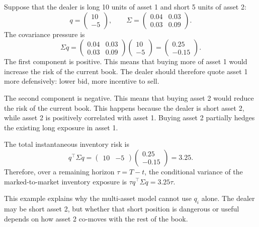 \documentclass[a4paper,10pt,titlepage,oneside,openany]{book}
\theoremstyle{plain}\newtheorem{theorem}{Theorem}[chapter]
\theoremstyle{definition}\newtheorem{definition}{Definition}[chapter]
\theoremstyle{remark}\newtheorem{remark}{Remark}[chapter]
\begin{document}
Suppose that the dealer is long 10 units of asset 1 and short 5 units of asset 2:
\[
q=
\begin{pmatrix}
10\\
-5
\end{pmatrix},
\qquad
\Sigma=
\begin{pmatrix}
0.04 & 0.03\\
0.03 & 0.09
\end{pmatrix}.
\]
The covariance pressure is
\[
\Sigma q
=
\begin{pmatrix}
0.04 & 0.03\\
0.03 & 0.09
\end{pmatrix}
\begin{pmatrix}
10\\
-5
\end{pmatrix}
=
\begin{pmatrix}
0.25\\
-0.15
\end{pmatrix}.
\]
The first component is positive. This means that buying more of asset 1 would increase the risk of the current book. The dealer should therefore quote asset 1 more defensively: lower bid, more incentive to sell.

The second component is negative. This means that buying asset 2 would reduce the risk of the current book. This happens because the dealer is short asset 2, while asset 2 is positively correlated with asset 1. Buying asset 2 partially hedges the existing long exposure in asset 1.

The total instantaneous inventory risk is
\[
q^\top\Sigma q
=
\begin{pmatrix}
10 & -5
\end{pmatrix}
\begin{pmatrix}
0.25\\
-0.15
\end{pmatrix}
=
3.25.
\]
Therefore, over a remaining horizon $\tau=T-t$, the conditional variance of the marked-to-market inventory exposure is $\tau q^\top\Sigma q=3.25\tau$.

This example explains why the multi-asset model cannot use $q_i$ alone. The dealer may be short asset 2, but whether that short position is dangerous or useful depends on how asset 2 co-moves with the rest of the book.
\end{document}
